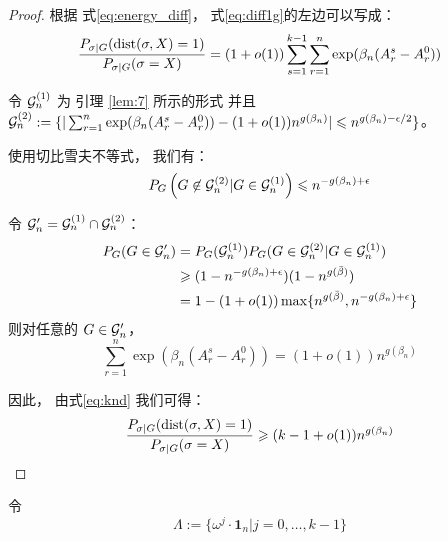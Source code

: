 \begin{proof}
根据 式\eqref{eq:energy_diff}，
式\eqref{eq:diff1g}的左边可以写成：
\begin{equation}\label{eq:knd}
	\frac{P_{\sigma|G}(\operatorname{dist}(\sigma, X)=1)}
{P_{\sigma|G}(\sigma=X)}= (1+o(1))\sum_{s=1}^{k-1}\sum_{r=1}^n \exp(\beta_n (A_r^s - A_r^0))
\end{equation}

令 $\mathcal{G}^{(1)}_n$ 为 引理 \ref{lem:7} 所示的形式
并且 $\cG^{(2)}_n: = \{|\sum_{r=1}^n \exp(\beta_n (A_r^s - A_r^0)) -\linebreak (1+o(1))n^{g(\beta_n)}  | \leq n^{g(\beta_n) - \epsilon / 2} \}$。

使用切比雪夫不等式， 我们有：
\begin{equation*}
  P_G \left(G \not\in \mathcal{G}^{(2)}_n \vert  G \in \mathcal{G}^{(1)}_n \right)
  \leqslant n^{- g(\beta_n) + \epsilon}
  \end{equation*}
  
  令 $\mathcal{G}'_n = \mathcal{G}^{(1)}_n \cap \mathcal{G}^{(2)}_n$：
  \begin{align*}
  P_G(G \in \mathcal{G}'_n) &= P_G(\mathcal{G}^{(1)}_n) P_G(G \in \mathcal{G}_n^{(2)} | G \in \mathcal{G}_n^{(1)}) \\
  & \geqslant (1-n^{ - g(\beta_n) + \epsilon})(1-n^{g(\bar{\beta})}) \\
  &= 1-(1+o(1))\max\{n^{g(\bar{\beta})}, n^{- g(\beta_n) + \epsilon} \}
  \end{align*}
  则对任意的 $G\in\mathcal{G}'_n$，
  \begin{equation*}
  \sum_{r=1}^n \exp(\beta_n (A_r^s - A_r^0)) = (1+o(1)) n^{g(\beta_n)}
  \end{equation*}
  
  因此，
  由式\eqref{eq:knd} 我们可得：
  \begin{equation*}
    \frac{P_{\sigma|G}(\operatorname{dist}(\sigma, X)=1)}
  {P_{\sigma|G}(\sigma=X)} \geqslant (k-1+o(1)) n^{g(\beta_n)}
  \end{equation*}
\end{proof}


令
\begin{equation}\label{eq:Big_Lambda}
  \Lambda := \{ \omega^j  \cdot \mathbf{1}_n | j=0, \dots,k-1\}   
\end{equation}

